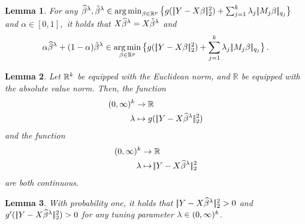 \documentclass[bj]{imsart}
\newcommand{\normtwo}[1]{\ensuremath{\!|\!| #1 | \! |_{2}}}
\newcommand{\normqj}[1]{\ensuremath{\!|\!| #1 | \! |_{q_j}}}
\newtheorem{lemma}{Lemma}[section]
\newcommand{\1}{{\rm 1}\mskip -4,5mu{\rm l} }
\newcommand{\argmin}{\mathop{\mathrm{arg\,min}}}
\def\R{\mathbb{R}}
\newcommand{\est}{\widehat\beta}
\newcommand{\lo}{\overline{\lambda}}
\begin{document}
\begin{lemma}\label{re:convexity} 
For any
$\estimatort, \tildeestimator  \in \argmin_{\beta\in\R^p} \big\{g(\,\normtwo{\outcome-\design\beta}^{2})+\sum_{j=1}^{\numbergroups}\lambda_j\,\normqj{\fusedmatrix_j\beta}\big\}$ and $\alpha \in [0,1],$  it holds that $\textcolor{black}{X}\widehat \beta^{\lambda}=\textcolor{black}{X} \tilde\beta^{\lambda}$ and
\begin{equation*}
\alpha\estimatort+(1-\alpha)\tildeestimator \in \argmin_{\beta\in\R^p} \big\{g(\,\normtwo{\outcome-\design\beta}^{2})+\sum_{j=1}^{\numbergroups}\lambda_j\,\normqj{\fusedmatrix_j\beta}\big\}\,.
\end{equation*}
\end{lemma}



\begin{lemma}\label{re:functions}
Let $\R^\numbergroups$ be  equipped with the Euclidean norm, and $\R$ be equipped with the  absolute value norm. Then, the function
\begin{align*}
(0,\infty)^\numbergroups &\to \R\\
  \lambda&\mapsto g(\,\normtwo{\outcome-\design\estimatort}^{2})
\end{align*}
and the function
\begin{align*}
(0,\infty)^\numbergroups &\to \R\\
  \lambda&\mapsto \normtwo{\outcome-\design\estimatort}^{2}
\end{align*}
are both continuous.
\end{lemma}


\begin{lemma}\label{re:nonzero}
 With probability one, it holds that $\,\normtwo{\outcome-\design\estimatort}^2>0$ and $g'(\,\normtwo{\outcome-\design\estimatort}^2)> 0$ for any tuning parameter $\lambda\in(0,\infty)^{k}$.
 \end{lemma}
 
 
 
\end{document}

